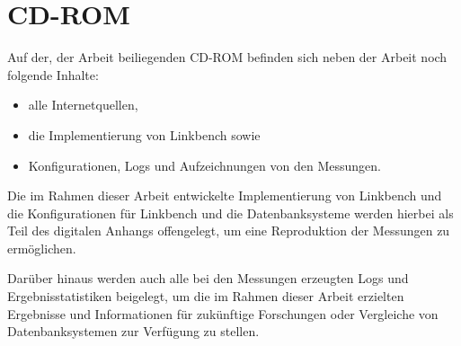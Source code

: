 \chapter{CD-ROM}
Auf der, der Arbeit beiliegenden CD-ROM befinden sich neben der Arbeit noch folgende Inhalte:
\begin{itemize}
    \item alle Internetquellen,
    \item die Implementierung von Linkbench sowie
    \item Konfigurationen, Logs und Aufzeichnungen von den Messungen.
\end{itemize}

Die im Rahmen dieser Arbeit entwickelte Implementierung von Linkbench und die Konfigurationen für Linkbench und die Datenbanksysteme werden hierbei als Teil des digitalen Anhangs offengelegt, um eine Reproduktion der Messungen zu ermöglichen. 

Darüber hinaus werden auch alle bei den Messungen erzeugten Logs und Ergebnisstatistiken beigelegt, um die im Rahmen dieser Arbeit erzielten Ergebnisse und Informationen für zukünftige Forschungen oder Vergleiche von Datenbanksystemen zur Verfügung zu stellen. 